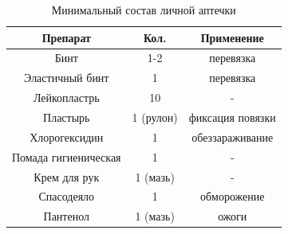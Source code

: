 \begin{table}[h]
	\centering
	\begin{tabular}{|c|c|c|}
		\hline
		Препарат & Кол. & Применение\\
		\hline
		Бинт	&1-2&	перевязка\\
		Эластичный бинт	&1&	перевязка\\
		Лейкопластрь	&10&	-\\
		Пластырь	&1 (рулон)&	фиксация повязки\\
		Хлорогексидин	&1&	обеззараживание\\
		Помада гигиеническая	&1&	-\\
		Крем для рук	&1 (мазь)&	-\\
		Спасодеяло	&1&	обморожение\\
		Пантенол	&1 (мазь)&	ожоги\\
		\hline
	\end{tabular}
	\caption{Минимальный состав личной аптечки}
\end{table}

\clearpage